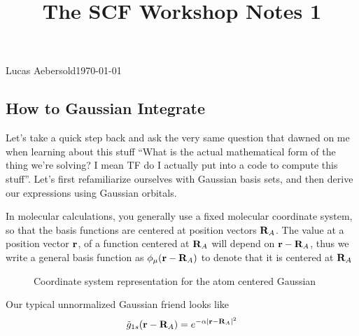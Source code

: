 \documentclass[11pt]{article}
\begin{document}
\title{The SCF Workshop Notes 1}{Lucas Aebersold}{\today}
\setcounter{section}{2}
\subsection{How to Gaussian Integrate}
Let's take a quick step back and ask the very same question that dawned on me when learning about this stuff ``What is the actual mathematical form of the thing we're solving? I mean TF do I actually put into a code to compute this stuff''. Let's first refamiliarize ourselves with Gaussian basis sets, and then derive our expressions using Gaussian orbitals. 

In molecular calculations, you generally use a fixed molecular coordinate system, so that the basis functions are centered at position vectors $\textbf{R}_A$. The value at a position vector $\textbf{r}$, of a function centered at $\textbf{R}_A$ will depend on $\textbf{r} - \textbf{R}_A$, thus we write a general basis function as $\phi_\mu (\textbf{r} - \textbf{R}_A)$ to denote that it is centered at $\textbf{R}_A$
\begin{figure}[H]
	\centering
{}
\caption{Coordinate system representation for the atom centered Gaussian}
\end{figure}
Our typical unnormalized Gaussian friend looks like
\begin{equation}\label{key}
\tilde{g}_{1s} (\textbf{r} - \textbf{R}_A) = e^{-\alpha | \textbf{r} - \textbf{R}_A|^2} 
\end{equation}
\end{document}
